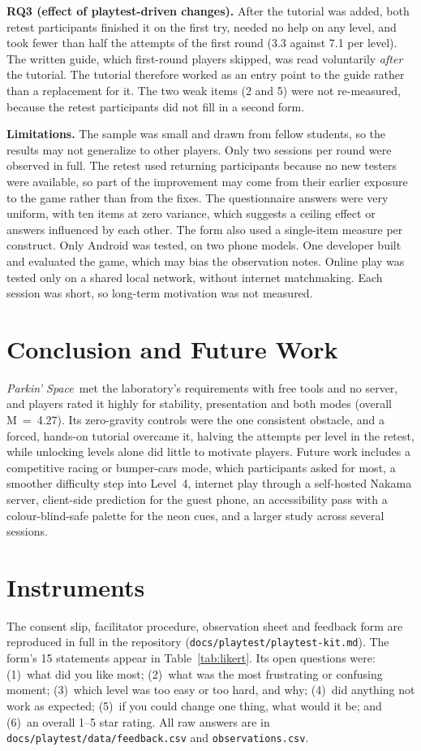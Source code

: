 \documentclass[conference]{IEEEtran}
\newcommand{\game}{\textit{Parkin' Space}}
\begin{document}
\textbf{RQ3 (effect of playtest-driven changes).} After the tutorial was added, both retest participants finished it on the first try, needed no help on any level, and took fewer than half the attempts of the first round (3.3 against 7.1 per level). The written guide, which first-round players skipped, was read voluntarily \emph{after} the tutorial. The tutorial therefore worked as an entry point to the guide rather than a replacement for it. The two weak items (2 and 5) were not re-measured, because the retest participants did not fill in a second form.

\textbf{Limitations.} The sample was small and drawn from fellow students, so the results may not generalize to other players. Only two sessions per round were observed in full. The retest used returning participants because no new testers were available, so part of the improvement may come from their earlier exposure to the game rather than from the fixes. The questionnaire answers were very uniform, with ten items at zero variance, which suggests a ceiling effect or answers influenced by each other. The form also used a single-item measure per construct. Only Android was tested, on two phone models. One developer built and evaluated the game, which may bias the observation notes. Online play was tested only on a shared local network, without internet matchmaking. Each session was short, so long-term motivation was not measured.

\section{Conclusion and Future Work}
\game\ met the laboratory's requirements with free tools and no server, and players rated it highly for stability, presentation and both modes (overall M~=~4.27). Its zero-gravity controls were the one consistent obstacle, and a forced, hands-on tutorial overcame it, halving the attempts per level in the retest, while unlocking levels alone did little to motivate players. Future work includes a competitive racing or bumper-cars mode, which participants asked for most, a smoother difficulty step into Level~4, internet play through a self-hosted Nakama server, client-side prediction for the guest phone, an accessibility pass with a colour-blind-safe palette for the neon cues, and a larger study across several sessions.

\appendices
\section{Instruments}
The consent slip, facilitator procedure, observation sheet and feedback form are reproduced in full in the repository (\texttt{docs/playtest/playtest-kit.md}). The form's 15 statements appear in Table~\ref{tab:likert}. Its open questions were: (1)~what did you like most; (2)~what was the most frustrating or confusing moment; (3)~which level was too easy or too hard, and why; (4)~did anything not work as expected; (5)~if you could change one thing, what would it be; and (6)~an overall 1--5 star rating. All raw answers are in \texttt{docs/playtest/data/feedback.csv} and \texttt{observations.csv}.
\end{document}
